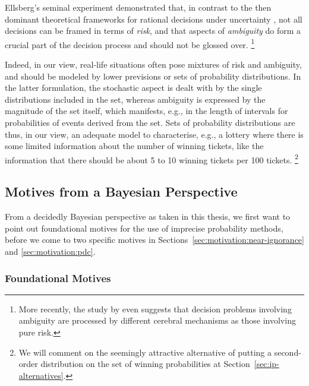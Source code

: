 Ellsberg's \parencite*{1961:ellsberg} seminal experiment demonstrated
that, in contrast to the then dominant theoretical frameworks
for rational decisions under uncertainty \parencite[most prominently,][]{1954:savage},
not all decisions can be framed in terms of \emph{risk},
and that aspects of \emph{ambiguity} do form a crucial part of the decision process
and should not be glossed over.%
\footnote{More recently, the study by \textcite{2005:hsu-bhatt}
even suggests that decision problems involving ambiguity are processed
by different cerebral mechanisms as those involving pure risk.}

Indeed, in our view, real-life situations often pose mixtures of risk and ambiguity,
and should be modeled by lower previsions or sets of probability distributions.
In the latter formulation,
the stochastic aspect is dealt with by the single distributions included in the set,
whereas ambiguity is expressed by the magnitude of the set itself,
which manifests, e.g., in the length of intervals for probabilities of events derived from the set.
Sets of probability distributions are thus, in our view,
an adequate model to characterise, e.g.,
a lottery where there is some limited information about the number of winning tickets,
like the information that there should be about 5 to 10 winning tickets per 100 tickets.%
\footnote{We will comment on the seemingly attractive alternative
of putting a second-order distribution on the set of winning probabilities %
at Section~\ref{sec:ip-alternatives}.}

\subsection{Motives from a Bayesian Perspective}
\label{sec:motivation:bayesian}

From a decidedly Bayesian perspective as taken in this thesis,
we first want to point out foundational motives for the use of imprecise probability methods,
before we come to two specific motives in Sections~\ref{sec:motivation:near-ignorance} and \ref{sec:motivation:pdc}.

\subsubsection{Foundational Motives}
\label{sec:motivation:bayesian-foundational}

